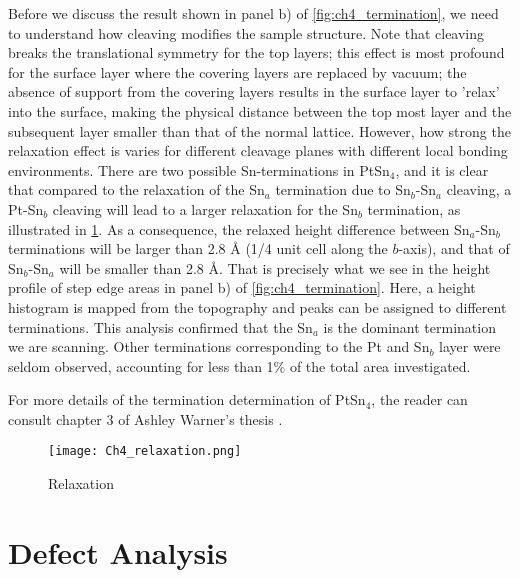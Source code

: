 Before we discuss the result shown in panel b) of \ref{fig:ch4_termination}, we need to understand how cleaving modifies the sample structure. Note that cleaving breaks the translational symmetry for the top layers; this effect is most profound for the surface layer where the covering layers are replaced by vacuum; the absence of support from the covering layers results in the surface layer to 'relax' into the surface, making the physical distance between the top most layer and the subsequent layer smaller than that of the normal lattice. However, how strong the relaxation effect is varies for different cleavage planes with different local bonding environments. There are two possible Sn-terminations in PtSn$_4$, and it is clear that compared to the relaxation of the Sn$_a$ termination due to Sn$_b$-Sn$_a$ cleaving, a Pt-Sn$_b$ cleaving will lead to a larger relaxation for the Sn$_b$ termination, as illustrated in \ref{fig:ch4_relaxation}. As a consequence, the relaxed height difference between Sn$_a$-Sn$_b$ terminations will be larger than 2.8 {\AA} (1/4 unit cell along the $b$-axis), and that of Sn$_b$-Sn$_a$ will be smaller than 2.8 {\AA}. That is precisely what we see in the height profile of step edge areas in panel b) of \ref{fig:ch4_termination}. Here, a height histogram is mapped from the topography and peaks can be assigned to different terminations. This analysis confirmed that the Sn$_a$ is the dominant termination we are scanning. Other terminations corresponding to the Pt and Sn$_b$ layer were seldom observed, accounting for less than 1\% of the total area investigated. 

\par For more details of the termination determination of PtSn$_4$, the reader can consult chapter 3 of Ashley Warner's thesis \cite{warner_defect_2022}.

\begin{figure}
	\centering
	\texttt{[image: Ch4\_relaxation.png]}
	\caption{Relaxation}
	\label{fig:ch4_relaxation}
\end{figure}



\section{Defect Analysis}

